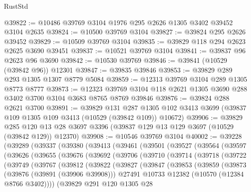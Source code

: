 \begin{lexlean}{RustStd}
\begin{coremodule}
@39822 := @10486 @39769 @3104 @1976 @295 @2626 @1305 @3402 @39452 @3104 @2635
@39824 := @10500 @39769 @3104
@39827 := @39824 @295 @2626 @39452
@39829 := @10509 @39769 @3104
@39835 := @39829 @118 @294 @2623 @2625 @3690 @39451
@39837 := @10521 @39769 @3104
@39841 := @39837 @96 @2623 @96 @3690
@39842 := @10530 @39769
@39846 := @39841 (@10529 (@39842 @96)) @12301
@39847 := @39835 @39846
@39853 := @39829 @289 @293 @1305 @1307 @8779 @5084
@39859 := @12313 @39769 @3104 @289 @1305 @8773 @8777
@39873 := @12323 @39769 @3104 @118 @2621 @1305 @3690 @288 @3402 @3700 @3104 @3683 @8765 @8769 @39846
@39876 := @39824 @288 @2621 @3700
@39891 := @39829
    @131
    @287
    @1305
    @102
    @3413
    @3699
    (@39837 @109 @1305 @109 @3413 (@10529 (@39842 @109)) @10672)
@39906 := @39829
    @285
    @120
    @13
    @28
    @3697
    @3396
    (@39837 @129 @13 @129 @3697 (@10529 (@39842 @129)) @12370)
@39908 := @10546 @39769 @3104
@40002 := @39228
    (@39289
      (@39337
        (@39380
          (@39413
            (@39461
              (@39501
                (@39527
                  (@39564
                    (@39597
                      (@39626
                        (@39655
                          (@39676
                            (@39692
                              (@39706
                                (@39710
                                  (@39714
                                    (@39718
                                      (@39722
                                        (@39749
                                          (@39767
                                            (@39812
                                              (@39822
                                                (@39827
                                                  (@39847
                                                    (@39853
                                                      (@39859
                                                        (@39873
                                                          (@39876 (@39891 (@39906 @39908)))
                                                          @27491
                                                          @10733
                                                          @12382
                                                          (@10570 (@12384 @8766 @3402))))
                                                      (@39829
                                                        @291
                                                        @120
                                                        @1305
                                                        @28

\end{coremodule}
\end{lexlean}
